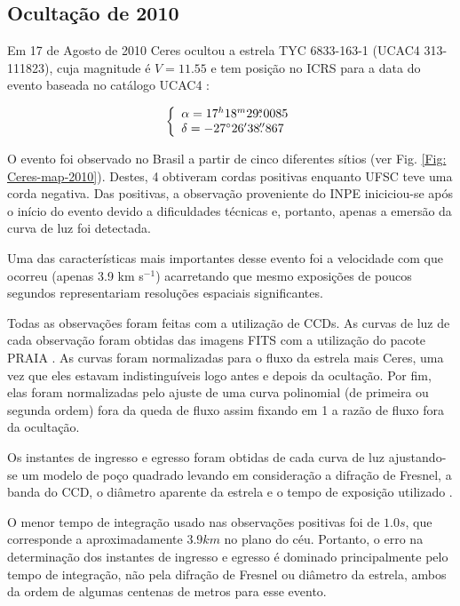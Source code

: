 \documentclass[12pt,a4paper]{monografia}
\newcommand{\degr}{\ensuremath{^{\circ}}}%
\newcommand{\arcmin}{\ensuremath{^{\prime}}}%
\newcommand{\fs}{\mbox{\ensuremath{.\!\!^s}}}
\newcommand{\farcs}{\mbox{\ensuremath{.\!\!^{\prime\prime}}}}%
\begin{document}
\subsection{Ocultação de 2010}
\label{Subsec: 2010-occ}

\indent \indent Em 17 de Agosto de 2010 Ceres ocultou a estrela TYC 6833-163-1 (UCAC4 313-111823), cuja magnitude é $V = 11.55$ e tem posição no ICRS para a data do evento baseada no catálogo UCAC4 \citep{Zacharias2013}:

\begin{equation}
\left\{ 
  \begin{array}{l l}
    \alpha = 17^{h}18^{m}29\fs 0085\\
    \delta = -27\degr 26\arcmin 38\farcs 867
  \end{array}
\right.
\label{Eq: 2010-coord}
\end{equation}

\indent O evento foi observado no Brasil a partir de cinco diferentes sítios (ver Fig. \ref{Fig: Ceres-map-2010}). Destes, 4 obtiveram cordas positivas enquanto UFSC teve uma corda negativa. Das positivas, a observação proveniente do INPE iniciciou-se após o início do evento devido a dificuldades técnicas e, portanto, apenas a emersão da curva de luz foi detectada.

Uma das características mais importantes desse evento foi a velocidade com que ocorreu (apenas 3.9 km s$^{-1}$) acarretando que mesmo exposições de poucos segundos representariam resoluções espaciais significantes.

Todas as observações foram feitas com a utilização de CCDs. As curvas de luz de cada observação foram obtidas das imagens FITS com a utilização do pacote PRAIA \citep[Plataforma de Redução Astrométrica de Imagens Astronômicas,][]{Assafin2011}. As curvas foram normalizadas para o fluxo da estrela mais Ceres, uma vez que eles estavam indistinguíveis logo antes e depois da ocultação. Por fim, elas foram normalizadas pelo ajuste de uma curva polinomial (de primeira ou segunda ordem) fora da queda de fluxo assim fixando em 1 a razão de fluxo fora da ocultação.

Os instantes de ingresso e egresso foram obtidas de cada curva de luz ajustando-se um modelo de poço quadrado levando em consideração a difração de Fresnel, a banda do CCD, o diâmetro aparente da estrela e o tempo de exposição utilizado \citep[ver][]{Widemann2009, Braga-Ribas2013}.

O menor tempo de integração usado nas observações positivas foi de $1.0s$, que corresponde a aproximadamente $3.9km$ no plano do céu. Portanto, o erro na determinação dos instantes de ingresso e egresso é dominado principalmente pelo tempo de integração, não pela difração de Fresnel ou diâmetro da estrela, ambos da ordem de algumas centenas de metros para esse evento.
\end{document}
